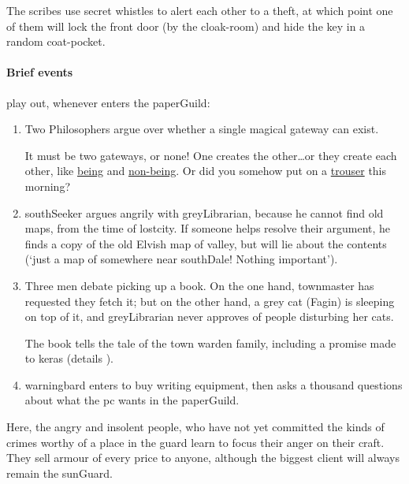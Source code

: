 \begin{multicols}{2}
The \glspl{scribe} use secret whistles to alert each other to a theft, at which point one of them will lock the front door (by the cloak-room) and hide the key in a random coat-pocket.

\paragraph{Brief events}
play out, whenever  enters the \gls{paperGuild}:

\begin{enumerate}
  \item
  Two Philosophers argue over whether a single magical gateway can exist.
  \begin{speechtext}
    It must be two gateways, or none!
    One creates the other\ldots or they create each other, like \underline{being} and \underline{non-being}.
    Or did you somehow put on a \underline{trouser} this morning?
  \end{speechtext}
  \item
  \Gls{southSeeker} argues angrily with \gls{greyLibrarian}, because he cannot find old maps, from the time of \gls{lostcity}.
  If someone helps resolve their argument, he finds a copy of the old Elvish map of \gls{valley}, but will lie about the contents (`just a map of somewhere near \gls{southDale}! Nothing important').
  \item
  Three men debate picking up a book.
  On the one hand, \gls{townmaster} has requested they fetch it; but on the other hand, a grey cat (Fagin) is sleeping on top of it, and \gls{greyLibrarian} never approves of people disturbing her cats.

  The book tells the tale of the \gls{town} \gls{warden} family, including a promise made to \gls{keras} (details ).
  \item
  \Gls{warningbard} enters to buy writing equipment, then asks a thousand questions about what the \gls{pc} wants in the \gls{paperGuild}.
\end{enumerate}


Here, the angry and insolent people, who have not yet committed the kinds of crimes worthy of a place in the \gls{guard} learn to focus their anger on their craft.
They sell armour of every price to anyone, although the biggest client will always remain the \gls{sunGuard}.



\end{multicols}

